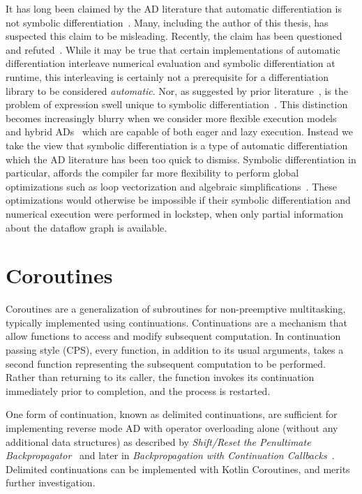 \documentclass[12pt,initial,twoside,maitrise]{dms}
\numberwithin{equation}{section}
\numberwithin{table}{chapter}
\numberwithin{figure}{chapter}
\begin{document}
It has long been claimed by the AD literature that automatic differentiation is not symbolic differentiation~\citep{baydin-survey}. Many, including the author of this thesis, has suspected this claim to be misleading. Recently, the claim has been questioned~\citep{wang2018demystifying} and refuted~\citep{laue2019equivalence}. While it may be true that certain implementations of automatic differentiation interleave numerical evaluation and symbolic differentiation at runtime, this interleaving is certainly not a prerequisite for a differentiation library to be considered \textit{automatic}. Nor, as suggested by prior literature~\citep{baydin2014ad}, is the problem of expression swell unique to symbolic differentiation~\citep{laue2019equivalence}. This distinction becomes increasingly blurry when we consider more flexible execution models~\citep{wang2018demystifying} and hybrid ADs~\citep{abadi2016tensorflow} which are capable of both eager and lazy execution. Instead we take the view that symbolic differentiation is a type of automatic differentiation which the AD literature has been too quick to dismiss. Symbolic differentiation in particular, affords the compiler far more flexibility to perform global optimizations such as loop vectorization and algebraic simplifications~\citep{bergstra2010theano}. These optimizations would otherwise be impossible if their symbolic differentiation and numerical execution were performed in lockstep, when only partial information about the dataflow graph is available.

\section{Coroutines}\label{sec:coroutines}

Coroutines are a generalization of subroutines for non-preemptive multitasking, typically implemented using continuations. Continuations are a mechanism that allow functions to access and modify subsequent computation. In continuation passing style (CPS), every function, in addition to its usual arguments, takes a second function representing the subsequent computation to be performed. Rather than returning to its caller, the function invokes its continuation immediately prior to completion, and the process is restarted.

One form of continuation, known as delimited continuations, are sufficient for implementing reverse mode AD with operator overloading alone (without any additional data structures) as described by \textit{Shift/Reset the Penultimate Backpropagator}~\citep{wang2018demystifying} and later in \textit{Backpropagation with Continuation Callbacks}~\citep{wang2018backpropagation}. Delimited continuations can be implemented with Kotlin Coroutines, and merits further investigation.
\end{document}
